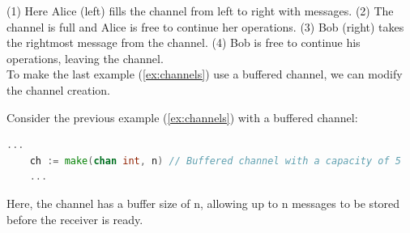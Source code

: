 \noindent
(1) Here Alice (left) fills the channel from left to right with messages. (2) The channel is full and Alice is free to continue her operations. (3) Bob (right) takes the rightmost message from the channel. (4) Bob is free to continue his operations, leaving the channel.\\

\noindent
To make the last example (\ref{ex:channels}) use a buffered channel, we can modify the channel creation.

\begin{Example}

    \label{ex:buffered}
    Consider the previous example (\ref{ex:channels}) with a buffered channel:
    \begin{lstlisting}[language=Go, caption=Using Buffered Channels to Synchronize Downloading and Processing, label={lst:buffered}, numbers=none]
    ...
    ch := make(chan int, n) // Buffered channel with a capacity of 5
    ...
    \end{lstlisting}
    \noindent
    Here, the channel has a buffer size of n, allowing up to n messages to be stored before the receiver is ready.
\end{Example}